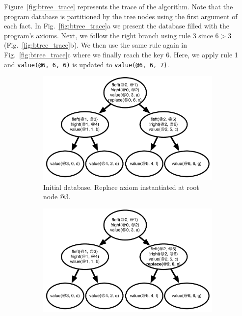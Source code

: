 Figure~\ref{fig:btree_trace} represents the trace of the algorithm. Note that the program database is partitioned
by the tree nodes using the first argument of each fact. In Fig.~\ref{fig:btree_trace}a we present the database
filled with the program's axioms. Next, we follow the right branch using rule 3 since $6 > 3$ (Fig.~\ref{fig:btree_trace}b).
We then use the same rule again in Fig.~\ref{fig:btree_trace}c where we finally reach the key 6. Here, we apply rule 1 and
\texttt{value(@6, 6, 6)} is updated to \texttt{value(@6, 6, 7)}.

\begin{figure}[ht]
        \centering
        \begin{subfigure}[b]{0.45\textwidth}
                \includegraphics[width=\textwidth]{btree_trace1}
                \caption{Initial database. Replace axiom instantiated at root node $@3$.}
                \label{fig:btree_trace1}
        \end{subfigure}%
        \begin{subfigure}[b]{0.45\textwidth}
                \includegraphics[width=\textwidth]{btree_trace2}

\end{subfigure}
\end{figure}

